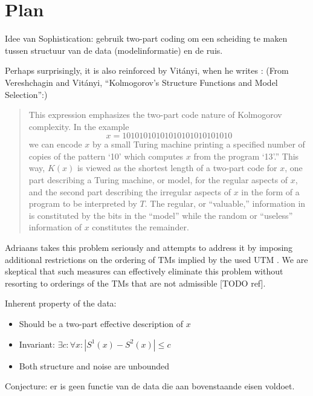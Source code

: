 \documentclass{style/llncs}
\begin{document}
\section{Plan}

Idee van Sophistication: gebruik two-part coding om een scheiding te maken tussen structuur van de data (modelinformatie) en de ruis.


Perhaps surprisingly, it is also reinforced by Vit\'anyi, when he writes : (From Vereshchagin and Vit\'anyi, ``Kolmogorov’s Structure Functions and Model Selection'':)
\begin{quotation}
  This expression emphasizes the two-part code nature of Kolmogorov complexity. In the example
\[x=10101010101010101010101010\]
we can encode $x$ by a small Turing machine printing a specified number of copies of the pattern `10' which computes $x$ from the program `13'.” This way, $K(x)$ is viewed as the shortest length of a two-part code for $x$, one part describing a Turing machine, or model, for the regular aspects of $x$, and the second part describing the irregular aspects of $x$ in the form of a program to be interpreted by $T$. The regular, or “valuable,” information in  is constituted by the bits in the “model” while the random or ``useless'' information of $x$ constitutes the remainder.
\end{quotation}



Adriaans takes this problem seriously and attempts to address it by imposing additional restrictions on the ordering of TMs implied by the used UTM \cite{adriaans2012facticity}. We are skeptical that such measures can effectively eliminate this problem without resorting to orderings of the TMs that are not admissible [TODO ref].



Inherent property of the data: 
\begin{itemize}
\item Should be a two-part effective description of $x$
\item Invariant: $\exists c:\forall x:|S^1(x)-S^2(x)|\le c$
\item Both structure and noise are unbounded
\end{itemize}

Conjecture: er is geen functie van de data die aan bovenstaande eisen voldoet.
\end{document}
